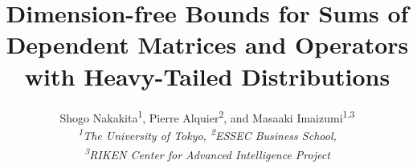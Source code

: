 \documentclass[11pt,a4paper]{article}
\theoremstyle{remark}
\theoremstyle{definition}
\theoremstyle{definition}
\begin{document}
% 
% 


\title{Dimension-free Bounds for Sums of Dependent Matrices and Operators with Heavy-Tailed Distributions}
\author{Shogo Nakakita\textsuperscript{1}, Pierre Alquier\textsuperscript{2}, and Masaaki Imaizumi\textsuperscript{1,3}\vspace{2ex}\\
{\it \textsuperscript{1}The University of Tokyo, \textsuperscript{2}ESSEC Business School,}\\
{\it \textsuperscript{3}RIKEN Center for Advanced Intelligence Project}}
\maketitle
\end{document}
